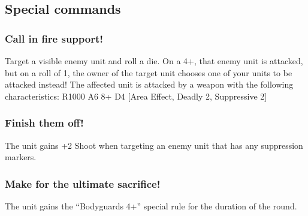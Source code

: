 \subsection*{Special commands}

\subsubsection*{Call in fire support!} Target a visible enemy unit and roll a die. On a 4+, that enemy unit is attacked, but on a roll of 1, the owner of the target unit chooses one of your units to be attacked instead! The affected unit is attacked by a weapon with the following characteristics: R1000 A6 8+ D4 [Area Effect, Deadly 2, Suppressive 2]

\subsubsection*{Finish them off!} The unit gains +2 Shoot when targeting an enemy unit that has any suppression markers.

\subsubsection*{Make for the ultimate sacrifice!} The unit gains the “Bodyguards 4+” special rule for the duration of the round.



\pagebreak



